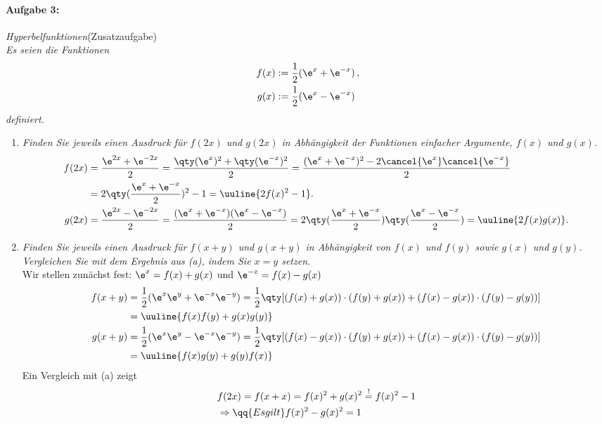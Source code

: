 \newpage
\paragraph{Aufgabe 3: } \emph{Hyperbelfunktionen}\hfill (Zusatzaufgabe)\\[0.2cm]
\emph{Es seien die Funktionen
\begin{align*}
    f(x)&:=\frac{1}{2}(\e^{x}+\e^{-x})\,,\\
    g(x)&:=\frac{1}{2}(\e^{x}-\e^{-x})
\end{align*}
definiert.}
\begin{enumerate}[label=(\alph*)]
    \item \emph{Finden Sie jeweils einen Ausdruck für $f(2x)$ und $g(2x)$ in Abhängigkeit der Funktionen einfacher Argumente, $f(x)$ und $g(x)$.}
    \begin{align}
        f(2x) &= \frac{\e^{2x}+ \e^{-2x}}{2} = \frac{\qty(\e^x)^2 + \qty(\e^{-x})^2}{2} = \frac{(\e^x + \e^{-x})^2 - 2 \cancel{\e^x} \cancel{\e^{-x}}}{2} \\
        &= 2\qty(\frac{\e^x + \e^{-x}}{2})^2 - 1 = \uuline{2 f(x)^2 - 1}.\\
        g(2x) &= \frac{\e^{2x}-\e^{-2x}}{2} = \frac{(\e^x +\e^{-x})(\e^x - \e^{-x})}{2} = 2\qty(\frac{\e^{x}+\e^{-x}}{2})\qty(\frac{\e^{x}-\e^{-x}}{2}) = \uuline{2 f(x) g(x)}.
    \end{align}
    \item \emph{Finden Sie jeweils einen Ausdruck für $f(x+y)$ und $g(x+y)$ in Abhängigkeit von $f(x)$ und $f(y)$ sowie $g(x)$ und $g(y)$. Vergleichen Sie mit dem Ergebnis aus (a), indem Sie $x=y$ setzen.}\\
    Wir stellen zunächst fest: $\e^{x} = f(x) + g(x)$ und $\e^{-x} = f(x) - g(x)$ 
    \begin{align}
        f(x+y) &= \frac{1}{2}(\e^x \e^y + \e^{-x} \e^{-y}) = \frac{1}{2}\qty[(f(x)+g(x))\cdot(f(y)+g(x))+(f(x)-g(x))\cdot(f(y)-g(y))] \\
        &= \uuline{f(x)f(y) + g(x)g(y)} \\
        g(x+y) &= \frac{1}{2}(\e^x \e^y -\e^{-x} \e^{-y}) = \frac{1}{2}\qty[(f(x)-g(x))\cdot(f(y)+g(x))+(f(x)-g(x))\cdot(f(y)-g(y))] \\
        &= \uuline{f(x)g(y)+g(y)f(x)}
    \end{align}
    Ein Vergleich mit (a) zeigt 
    \begin{align}
        &f(2x) = f(x+x) = f(x)^2 + g(x)^2 \overset{!}{=} f(x)^2 - 1 \notag \\
        &\Rightarrow \qq{Es gilt} f(x)^2 - g(x)^2 = 1\\

\end{align}
\end{enumerate}
